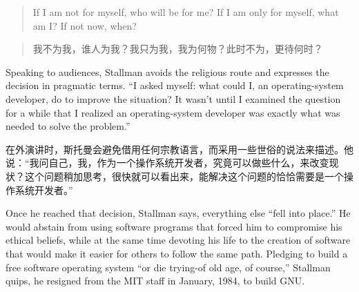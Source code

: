 \ifdefined\eng
\begin{quote}
If I am not for myself, who will be for me? If I am only for myself, what am I? If not now, when?
\end{quote}
\fi

\ifdefined\chs
\begin{quote}
我不为我，谁人为我？我只为我，我为何物？此时不为，更待何时？
\end{quote}
\fi

\ifdefined\eng
Speaking to audiences, Stallman avoids the religious route and expresses the decision in pragmatic terms. ``I asked myself: what could I, an operating-system developer, do to improve the situation? It wasn't until I examined the question for a while that I realized an operating-system developer was exactly what was needed to solve the problem.''
\fi

\ifdefined\chs
在外演讲时，斯托曼会避免借用任何宗教语言，而采用一些世俗的说法来描述。他说：``我问自己，我，作为一个操作系统开发者，究竟可以做些什么，来改变现状？这个问题稍加思考，很快就可以看出来，能解决这个问题的恰恰需要是一个操作系统开发者。''
\fi

\ifdefined\eng
\ifdefined\vone
Once he reached that decision, Stallman says, everything else ``fell into place.'' He would abstain from using software programs that forced him to compromise his ethical beliefs, while at the same time devoting his life to the creation of software that would make it easier for others to follow the same path. Pledging to build a free software operating system ``or die trying-of old age, of course,'' Stallman quips, he resigned from the MIT staff in January, 1984, to build GNU.
\fi

